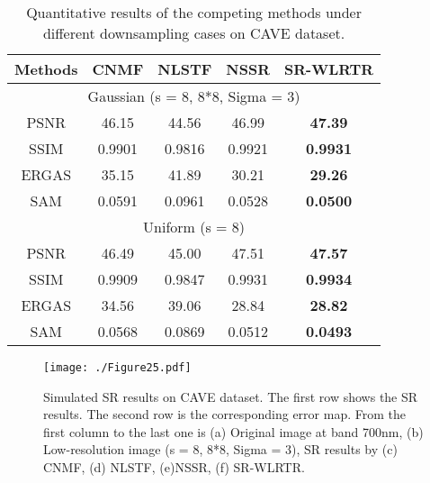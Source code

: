 \documentclass[twocolumn]{svjour3}          %
\begin{document}
\begin{table}[tbp]
\centering
\renewcommand{\arraystretch}{1.2}
\caption{Quantitative results of the competing methods under different downsampling cases on CAVE dataset.}
\label{CAVE super-resolution quantitative}
\begin{tabular}{|c|c|c|c|c|}
\hline
Methods   & CNMF     & NLSTF    & NSSR     & SR-WLRTR  \\ \hline
\multicolumn{5}{|c|}{Gaussian (s = 8, 8*8, Sigma = 3)} \\ \hline
PSNR      & 46.15    & 44.56    & 46.99    & \textbf{47.39}     \\ \hline
SSIM      & 0.9901   & 0.9816   & 0.9921   & \textbf{0.9931}    \\ \hline
ERGAS     & 35.15    & 41.89    & 30.21    & \textbf{29.26}     \\ \hline
SAM       & 0.0591   & 0.0961   & 0.0528   & \textbf{0.0500}    \\ \hline
\multicolumn{5}{|c|}{Uniform (s = 8)}                  \\ \hline
PSNR      & 46.49    & 45.00    & 47.51    & \textbf{47.57}     \\ \hline
SSIM      & 0.9909   & 0.9847   & 0.9931   & \textbf{0.9934}    \\ \hline
ERGAS     & 34.56    & 39.06    & 28.84    & \textbf{28.82}     \\ \hline
SAM       & 0.0568   & 0.0869   & 0.0512   & \textbf{0.0493 }   \\ \hline
\end{tabular}
\end{table}

\begin{figure*}
\begin{center}
    \texttt{[image: ./Figure25.pdf]}
\end{center}
   \caption{Simulated SR results on CAVE dataset. The first row shows the SR results. The second row is the corresponding error map. From the first column to the last one is (a) Original image at band 700nm, (b) Low-resolution image (s = 8, 8*8, Sigma = 3), SR results by (c) CNMF, (d) NLSTF, (e)NSSR, (f) SR-WLRTR.}
\label{super-resolution}
\end{figure*}

\end{document}
